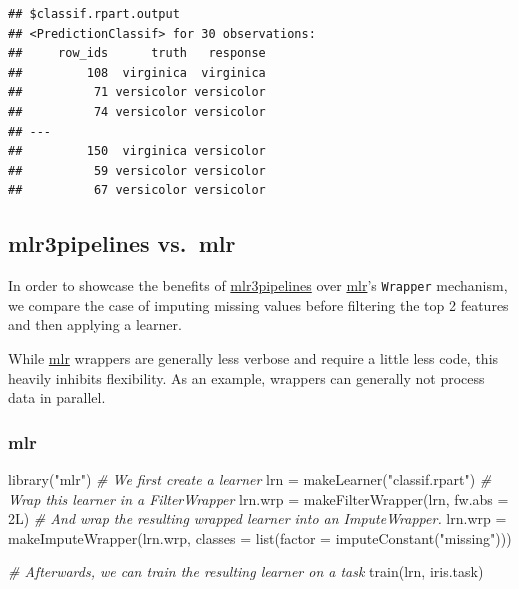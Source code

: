 \documentclass[
]{scrbook}
\newenvironment{Shaded}{\begin{snugshade}}{\end{snugshade}}
\newcommand{\AttributeTok}[1]{\textcolor[rgb]{0.77,0.63,0.00}{#1}}
\newcommand{\CommentTok}[1]{\textcolor[rgb]{0.56,0.35,0.01}{\textit{#1}}}
\newcommand{\FunctionTok}[1]{\textcolor[rgb]{0.00,0.00,0.00}{#1}}
\newcommand{\NormalTok}[1]{#1}
\newcommand{\OtherTok}[1]{\textcolor[rgb]{0.56,0.35,0.01}{#1}}
\newcommand{\StringTok}[1]{\textcolor[rgb]{0.31,0.60,0.02}{#1}}
\renewenvironment{Shaded} {\begin{snugshade}\small} {\end{snugshade}}
\begin{document}
\begin{verbatim}
## $classif.rpart.output
## <PredictionClassif> for 30 observations:
##     row_ids      truth   response
##         108  virginica  virginica
##          71 versicolor versicolor
##          74 versicolor versicolor
## ---                              
##         150  virginica versicolor
##          59 versicolor versicolor
##          67 versicolor versicolor
\end{verbatim}

\hypertarget{mlr3pipelines-vs.-mlr}{%
\subsection{mlr3pipelines vs.~mlr}\label{mlr3pipelines-vs.-mlr}}

In order to showcase the benefits of \href{https://cran.r-project.org/package=mlr3pipelines}{mlr3pipelines} over \href{https://cran.r-project.org/package=mlr}{mlr}'s \texttt{Wrapper} mechanism, we compare the case of imputing missing values before filtering the top 2 features and then applying a learner.

While \href{https://cran.r-project.org/package=mlr}{mlr} wrappers are generally less verbose and require a little less code, this heavily inhibits flexibility.
As an example, wrappers can generally not process data in parallel.

\hypertarget{mlr}{%
\subsubsection{mlr}\label{mlr}}

\begin{Shaded}
\begin{Highlighting}[]
\FunctionTok{library}\NormalTok{(}\StringTok{"mlr"}\NormalTok{)}
\CommentTok{\# We first create a learner}
\NormalTok{lrn }\OtherTok{=} \FunctionTok{makeLearner}\NormalTok{(}\StringTok{"classif.rpart"}\NormalTok{)}
\CommentTok{\# Wrap this learner in a FilterWrapper}
\NormalTok{lrn.wrp }\OtherTok{=} \FunctionTok{makeFilterWrapper}\NormalTok{(lrn, }\AttributeTok{fw.abs =}\NormalTok{ 2L)}
\CommentTok{\# And wrap the resulting wrapped learner into an ImputeWrapper.}
\NormalTok{lrn.wrp }\OtherTok{=} \FunctionTok{makeImputeWrapper}\NormalTok{(lrn.wrp, }\AttributeTok{classes =} \FunctionTok{list}\NormalTok{(}\AttributeTok{factor =} \FunctionTok{imputeConstant}\NormalTok{(}\StringTok{"missing"}\NormalTok{)))}

\CommentTok{\# Afterwards, we can train the resulting learner on a task}
\FunctionTok{train}\NormalTok{(lrn, iris.task)}
\end{Highlighting}
\end{Shaded}
\end{document}
